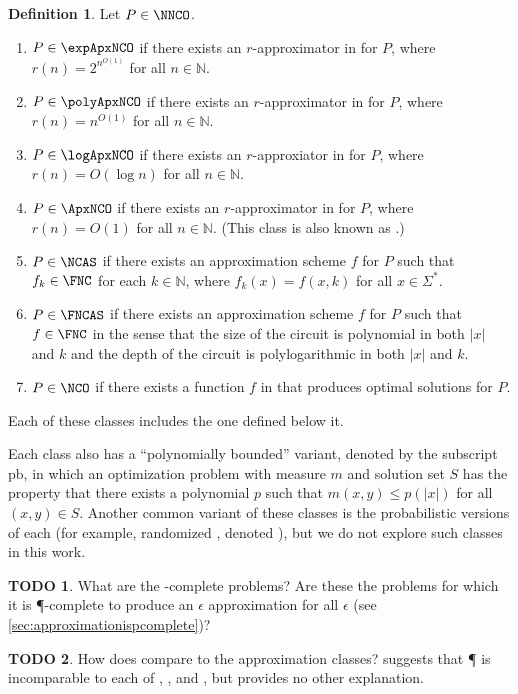 \documentclass[]{article}
\theoremstyle{definition} \newtheorem{definition}{Definition}
\theoremstyle{definition} \newtheorem{openquestion}{Open question}
\newtheorem{todo}{TODO}
\newcommand{\pb}{\textsf{pb}}
\begin{document}
\begin{definition}
  Let $P\in\NNCO$.
  \begin{enumerate}
  \item $P\in\expApxNCO$ if there exists an $r$-approximator in \FNC{} for $P$, where $r(n)=2^{n^{O(1)}}$ for all $n\in\mathbb{N}$.
  \item $P\in\polyApxNCO$ if there exists an $r$-approximator in \FNC{} for $P$, where $r(n)=n^{O(1)}$ for all $n\in\mathbb{N}$.
  \item $P\in\logApxNCO$ if there exists an $r$-approxiator in \FNC{} for $P$, where $r(n)=O(\log n)$ for all $n\in\mathbb{N}$.
  \item $P\in\ApxNCO$ if there exists an $r$-approximator in \FNC{} for $P$, where $r(n)=O(1)$ for all $n\in\mathbb{N}$.
    (This class is also known as \NCX.)
  \item $P\in\NCAS$ if there exists an approximation scheme $f$ for $P$ such that $f_k\in\FNC$ for each $k\in\mathbb{N}$, where $f_k(x)=f(x, k)$ for all $x\in\Sigma^*$.
  \item $P\in\FNCAS$ if there exists an approximation scheme $f$ for $P$ such that $f\in\FNC$ in the sense that the size of the circuit is polynomial in both $|x|$ and $k$ and the depth of the circuit is polylogarithmic in both $|x|$ and $k$.
  \item $P\in\NCO$ if there exists a function $f$ in \FNC{} that produces optimal solutions for $P$.
  \end{enumerate}
\end{definition}

Each of these classes includes the one defined below it.

Each class also has a ``polynomially bounded'' variant, denoted by the subscript \pb, in which an optimization problem with measure $m$ and solution set $S$ has the property that there exists a polynomial $p$ such that $m(x, y) \leq p(|x|)$ for all $(x, y)\in S$.
Another common variant of these classes is the probabilistic versions of each (for example, randomized \NCAS{}, denoted \RNCAS), but we do not explore such classes in this work.

\begin{todo}
  What are the \PO-complete problems?
  Are these the problems for which it is \P-complete to produce an $\epsilon$ approximation for all $\epsilon$ (see \autoref{sec:approximationispcomplete})?
\end{todo}

\begin{todo}
  How does \PO{} compare to the \NC{} approximation classes?
  \cite[Figure~2.2]{dsst97} suggests that \P{} is incomparable to each of \FNCAS, \NCAS, and \ApxNCO, but provides no other explanation.
\end{todo}
\end{document}
